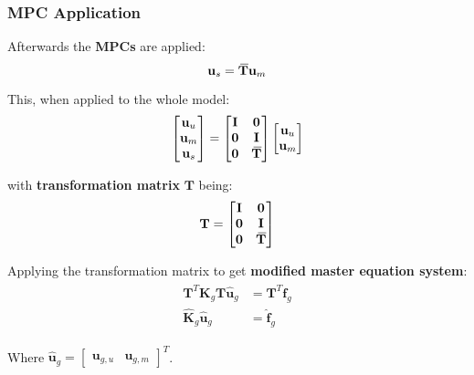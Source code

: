 \documentclass[10pt,b5paper,titlepage]{book}
\newcommand{\m}{\mathbf}
\newcommand{\closure}[2][3]{%
{}\mkern#1mu\overline{\mkern-#1mu#2}}
\newenvironment{eqarray}
{
    \begin{eqnarray}
        \begin{aligned}
}
{
        \end{aligned}
    \end{eqnarray}
}
\begin{document}
\subsubsection{MPC Application}

Afterwards the \textbf{MPCs} are applied:
\begin{equation}
    \m{u}_s = \m{\closure{T}} \m{u}_m
\end{equation}

This, when applied to the whole model:
\begin{equation}
    \begin{bmatrix}
        \m{u}_u  \\
        \m{u}_m \\
        \m{u}_s \\
    \end{bmatrix}
    = \begin{bmatrix}
        \m{I} & \m{0} \\
        \m{0} & \m{I} \\
        \m{0} & \m{\closure{T}} \\
    \end{bmatrix}
    \begin{bmatrix}
        \m{u}_u \\
        \m{u}_m \\
    \end{bmatrix}
\end{equation}

with \textbf{transformation matrix} $ \m{T} $ being:
\begin{equation}
    \m{T} = \begin{bmatrix}
        \m{I} & \m{0} \\
        \m{0} & \m{I} \\
        \m{0} & \m{\closure{T}} \\
    \end{bmatrix}
\end{equation}

Applying the transformation matrix to get \textbf{modified master equation system}:
\begin{eqarray}
    \m{T}^T \m{K}_g \m{T} \m{\hat{u}}_g &= \m{T}^T \m{f}_g \\
    \m{\hat{K}}_g \m{\hat{u}}_g &= \m{\hat{f}}_g
\end{eqarray}

Where $ \m{\hat{u}}_g = \begin{bmatrix} \m{u}_{g,u} & \m{u}_{g,m} \end{bmatrix}^T $.
\end{document}
